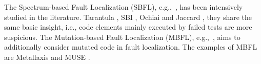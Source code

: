 The Spectrum-based Fault Localization
(SBFL), e.g.,~\cite{Ochiai,abreu2007accuracy,
	jones2005empirical,keller2017critical, liblit2005scalable,
	lucia2014extended,naish2011model, wong2007effective,
	zhang2011localizing}, has been intensively studied in the
literature.  Tarantula \cite{jones2001visualization}, SBI
\cite{liblit2005scalable}, Ochiai \cite{Ochiai} and Jaccard
\cite{abreu2007accuracy}, they share the same basic insight, i.e.,
code elements mainly executed by failed tests are more suspicious.
The Mutation-based Fault Localization (MBFL), e.g.,~\cite{budd1981mutation,MUSE,musco2017large,zhang2010test,
	zhang2013injecting},
aims to additionally consider mutated code in fault
localization.
The examples of MBFL are Metallaxis \cite{papadakis2012using,
	Metallaxis} and MUSE \cite{MUSE}.
%
\fi
